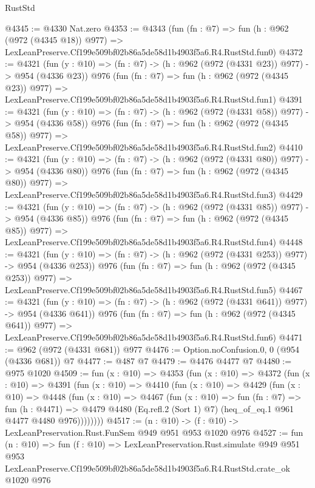 \begin{lexlean}{RustStd}
\begin{coremodule}
@4345 := @4330 Nat.zero
@4353 := @4343
    (fun (fn : @7) =>
    fun (h : @962 (@972 (@4345 @18)) @977) =>
    LexLeanPreserve.Cf199e509bf02b86a5de58d1b4903f5a6.R4.RustStd.fun0)
@4372 := @4321
    (fun (y : @10) => (fn : @7) -> (h : @962 (@972 (@4331 @23)) @977) -> @954 (@4336 @23))
    @976
    (fun (fn : @7) =>
    fun (h : @962 (@972 (@4345 @23)) @977) =>
    LexLeanPreserve.Cf199e509bf02b86a5de58d1b4903f5a6.R4.RustStd.fun1)
@4391 := @4321
    (fun (y : @10) => (fn : @7) -> (h : @962 (@972 (@4331 @58)) @977) -> @954 (@4336 @58))
    @976
    (fun (fn : @7) =>
    fun (h : @962 (@972 (@4345 @58)) @977) =>
    LexLeanPreserve.Cf199e509bf02b86a5de58d1b4903f5a6.R4.RustStd.fun2)
@4410 := @4321
    (fun (y : @10) => (fn : @7) -> (h : @962 (@972 (@4331 @80)) @977) -> @954 (@4336 @80))
    @976
    (fun (fn : @7) =>
    fun (h : @962 (@972 (@4345 @80)) @977) =>
    LexLeanPreserve.Cf199e509bf02b86a5de58d1b4903f5a6.R4.RustStd.fun3)
@4429 := @4321
    (fun (y : @10) => (fn : @7) -> (h : @962 (@972 (@4331 @85)) @977) -> @954 (@4336 @85))
    @976
    (fun (fn : @7) =>
    fun (h : @962 (@972 (@4345 @85)) @977) =>
    LexLeanPreserve.Cf199e509bf02b86a5de58d1b4903f5a6.R4.RustStd.fun4)
@4448 := @4321
    (fun (y : @10) => (fn : @7) -> (h : @962 (@972 (@4331 @253)) @977) -> @954 (@4336 @253))
    @976
    (fun (fn : @7) =>
    fun (h : @962 (@972 (@4345 @253)) @977) =>
    LexLeanPreserve.Cf199e509bf02b86a5de58d1b4903f5a6.R4.RustStd.fun5)
@4467 := @4321
    (fun (y : @10) => (fn : @7) -> (h : @962 (@972 (@4331 @641)) @977) -> @954 (@4336 @641))
    @976
    (fun (fn : @7) =>
    fun (h : @962 (@972 (@4345 @641)) @977) =>
    LexLeanPreserve.Cf199e509bf02b86a5de58d1b4903f5a6.R4.RustStd.fun6)
@4471 := @962 (@972 (@4331 @681)) @977
@4476 := Option.noConfusion.{0, 0} (@954 (@4336 @681)) @7
@4477 := @487 @7
@4479 := @4476 @4477 @7
@4480 := @975 @1020
@4509 := fun (x : @10) =>
  @4353
    (fun (x : @10) =>
    @4372
      (fun (x : @10) =>
      @4391
        (fun (x : @10) =>
        @4410
          (fun (x : @10) =>
          @4429
            (fun (x : @10) =>
            @4448
              (fun (x : @10) =>
              @4467
                (fun (x : @10) =>
                fun (fn : @7) =>
                fun (h : @4471) =>
                @4479 @4480 (Eq.refl.{2} (Sort 1) @7) (heq_of_eq.{1} @961 @4477 @4480 @976))))))))
@4517 := (n : @10) -> (f : @10) -> LexLeanPreservation.Rust.FunSem @949 @951 @953 @1020 @976
@4527 := fun (n : @10) =>
  fun (f : @10) =>
  LexLeanPreservation.Rust.simulate
    @949
    @951
    @953
    LexLeanPreserve.Cf199e509bf02b86a5de58d1b4903f5a6.R4.RustStd.crate_ok
    @1020
    @976
\end{coremodule}
\end{lexlean}
